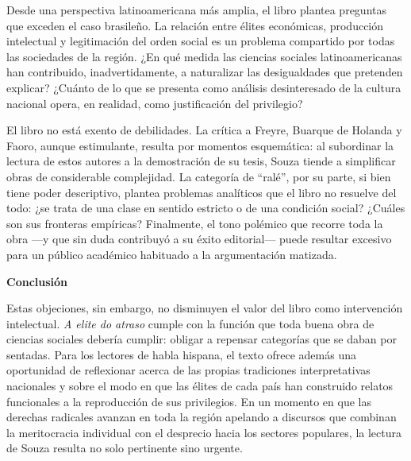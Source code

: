 \documentclass{article}
\begin{document}
Desde una perspectiva latinoamericana más amplia, el libro plantea preguntas que exceden el caso brasileño. La relación entre élites económicas, producción intelectual y legitimación del orden social es un problema compartido por todas las sociedades de la región. ¿En qué medida las ciencias sociales latinoamericanas han contribuido, inadvertidamente, a naturalizar las desigualdades que pretenden explicar? ¿Cuánto de lo que se presenta como análisis desinteresado de la cultura nacional opera, en realidad, como justificación del privilegio?

El libro no está exento de debilidades. La crítica a Freyre, Buarque de Holanda y Faoro, aunque estimulante, resulta por momentos esquemática: al subordinar la lectura de estos autores a la demostración de su tesis, Souza tiende a simplificar obras de considerable complejidad. La categoría de “ralé”, por su parte, si bien tiene poder descriptivo, plantea problemas analíticos que el libro no resuelve del todo: ¿se trata de una clase en sentido estricto o de una condición social? ¿Cuáles son sus fronteras empíricas? Finalmente, el tono polémico que recorre toda la obra —y que sin duda contribuyó a su éxito editorial— puede resultar excesivo para un público académico habituado a la argumentación matizada.

\textbf{Conclusión}

Estas objeciones, sin embargo, no disminuyen el valor del libro como intervención intelectual. \textit{A elite do atraso} cumple con la función que toda buena obra de ciencias sociales debería cumplir: obligar a repensar categorías que se daban por sentadas. Para los lectores de habla hispana, el texto ofrece además una oportunidad de reflexionar acerca de las propias tradiciones interpretativas nacionales y sobre el modo en que las élites de cada país han construido relatos funcionales a la reproducción de sus privilegios. En un momento en que las derechas radicales avanzan en toda la región apelando a discursos que combinan la meritocracia individual con el desprecio hacia los sectores populares, la lectura de Souza resulta no solo pertinente sino urgente.
\end{document}
